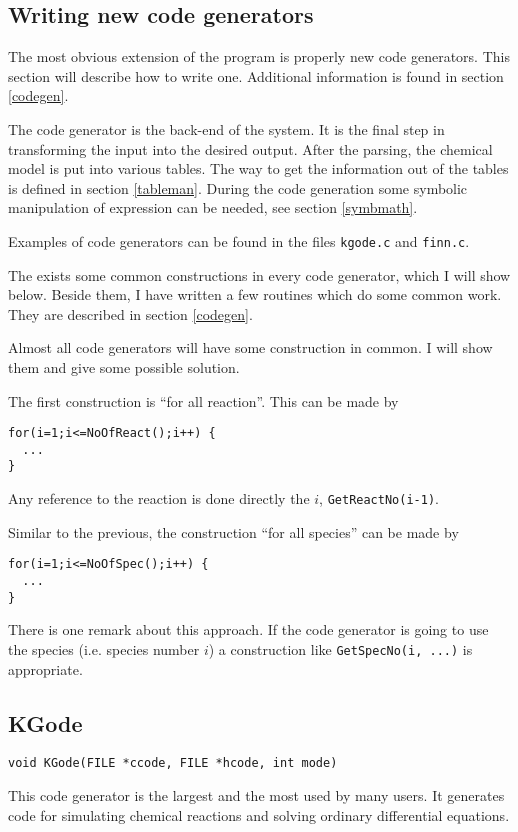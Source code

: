 \subsection{Writing new code generators}
The most obvious extension of the program is properly new code 
generators. This section will describe how to write one. Additional 
information is found in section \ref{codegen}.

The code generator is the back-end of the system. It is the final step
in transforming the input into the desired output. After the parsing,
the chemical model is put into various tables. The way to get the 
information out of the tables is defined in section \ref{tableman}.
During the code generation some symbolic manipulation of expression
can be needed, see section \ref{symbmath}.

Examples of code generators can be found in the files {\tt kgode.c} 
and {\tt finn.c}. 

The exists some common constructions in every code generator, which I
will show below. Beside them, I have written a few routines which do
some common work. They are described in section \ref{codegen}.

Almost all code generators will have some 
construction in common. I will show them and give some possible solution. 

The first construction is ``for all reaction''. This can be made by 
\begin{verbatim}
for(i=1;i<=NoOfReact();i++) {
  ...
}
\end{verbatim}
Any reference to the reaction is done directly the $i$, \eg
{\tt GetReactNo(i-1)}.

Similar to the previous, the construction ``for all species'' can be made by
\begin{verbatim}
for(i=1;i<=NoOfSpec();i++) {
  ...
}  
\end{verbatim}
There is one remark about this approach. If the code generator is
going to use the species (i.e. species number $i$) a construction 
like {\tt GetSpecNo(i, ...)} is appropriate.   


\subsection{KGode}
\begin{verbatim}
void KGode(FILE *ccode, FILE *hcode, int mode)
\end{verbatim}

This code generator is the largest and the most used by many users. It
generates code for simulating chemical reactions and solving ordinary
differential equations. 

